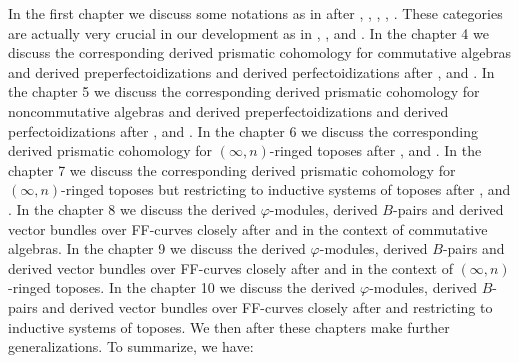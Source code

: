 \documentclass[12pt]{book}
\begin{document}
\indent In the first chapter we discuss some notations as in \cite{T2} after \cite{BK}, \cite{BBK}, \cite{BBBK}, \cite{BBM}, \cite{KKM}. These categories are actually very crucial in our development as in \cite{M}, \cite{CS1},  \cite{CS2} and \cite{CS3}. In the chapter 4 we discuss the corresponding derived prismatic cohomology for commutative algebras and derived preperfectoidizations and derived perfectoidizations after \cite{BS}, \cite{Sch} and \cite{BL}. In the chapter 5 we discuss the corresponding derived prismatic cohomology for noncommutative algebras and derived preperfectoidizations and derived perfectoidizations after \cite{BS}, \cite{Sch} and \cite{BL}. In the chapter 6 we discuss the corresponding derived prismatic cohomology for $(\infty,n)$-ringed toposes after \cite{BS}, \cite{Sch} and \cite{BL}. In the chapter 7 we discuss the corresponding derived prismatic cohomology for $(\infty,n)$-ringed toposes but restricting to inductive systems of toposes after \cite{BS}, \cite{Sch} and \cite{BL}. In the chapter 8 we discuss the derived $\varphi$-modules, derived $B$-pairs and derived vector bundles over FF-curves closely after \cite{KL1} and \cite{KL2} in the context of commutative algebras. In the chapter 9 we discuss the derived $\varphi$-modules, derived $B$-pairs and derived vector bundles over FF-curves closely after \cite{KL1} and \cite{KL2} in the context of $(\infty,n)$-ringed toposes. In the chapter 10 we discuss the derived $\varphi$-modules, derived $B$-pairs and derived vector bundles over FF-curves closely after \cite{KL1} and \cite{KL2} restricting to inductive systems of toposes. We then after these chapters make further generalizations. To summarize, we have:
\end{document}
